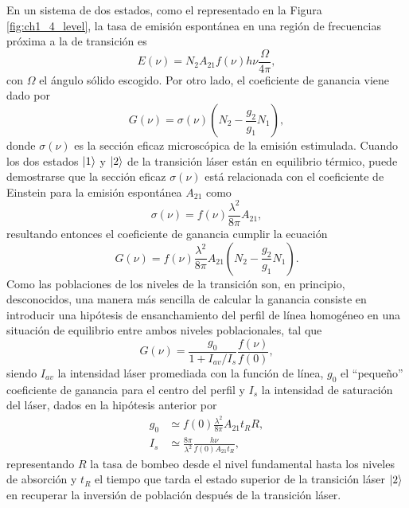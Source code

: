 En un sistema de dos estados, como el representado en la Figura \ref{fig:ch1_4_level}, la tasa de emisión espontánea en una región de frecuencias próxima a la de transición es \autocite{Tallents2003}
\begin{equation}\label{eq:2.15}
  E(\nu) = N_{2}A_{21}f(\nu)h \nu\frac{\Omega}{4 \pi},
\end{equation}
con $\Omega$ el ángulo sólido escogido. Por otro lado, el coeficiente de ganancia viene dado por
\begin{equation}\label{eq:2.16}
  G(\nu) = \sigma(\nu)\left(N_{2}-\frac{g_{2}}{g_{1}}N_{1}\right),
\end{equation}
donde $\sigma(\nu)$ es la sección eficaz microscópica de la emisión estimulada. Cuando los dos estados $\left|1\right\rangle$ y $\left|2\right\rangle$ de la transición láser están en equilibrio térmico, puede demostrarse que la sección eficaz $\sigma(\nu)$ está relacionada con el coeficiente de Einstein para la emisión espontánea $A_{21}$ como \autocite{Tallents2003}
\begin{equation}\label{eq:2.16}
  \sigma(\nu) = f(\nu)\frac{\lambda^{2}}{8 \pi}A_{21},
\end{equation}
resultando entonces el coeficiente de ganancia cumplir la ecuación
\begin{equation}\label{eq:2.17}
  G(\nu) = f(\nu)\frac{\lambda^{2}}{8 \pi}A_{21}\left(N_{2}-\frac{g_{2}}{g_{1}}N_{1}\right).
\end{equation}
Como las poblaciones de los niveles de la transición son, en principio, desconocidos, una manera más sencilla de calcular la ganancia consiste en introducir una hipótesis de ensanchamiento del perfil de línea homogéneo \autocite{Tallents2003} en una situación de equilibrio entre ambos niveles poblacionales, tal que
\begin{equation}\label{eq:2.18}
  G(\nu) = \frac{g_{0}}{1+I_{av}/I_{s}}\frac{f(\nu)}{f(0)},
\end{equation}
siendo $I_{av}$ la intensidad láser promediada con la función de línea, $g_{0}$ el \enquote{pequeño} coeficiente de ganancia para el centro del perfil y $I_{s}$ la intensidad de saturación del láser, dados en la hipótesis anterior por
\begin{align}
    g_{0} &\simeq f(0)\frac{\lambda^{2}}{8 \pi}A_{21}t_{R}R, \\
    I_{s} &\simeq \frac{8 \pi}{\lambda^{2}}\frac{h \nu}{f(0)A_{21}t_{R}},
\end{align}
representando $R$ la tasa de bombeo desde el nivel fundamental hasta los niveles de absorción y $t_{R}$ el tiempo que tarda el estado superior de la transición láser $\left|2\right\rangle$ en recuperar la inversión de población después de la transición láser. 

